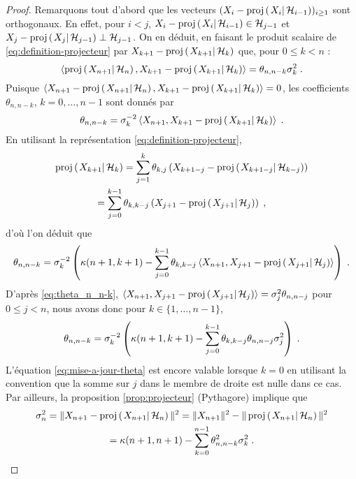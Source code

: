 \begin{proof}\smartqed
Remarquons tout d'abord que les vecteurs $(X_i -
\proj{X_i}{\cH_{i-1}})_{i \geq 1}$ sont orthogonaux. En effet,
pour $i < j$, $X_i - \proj{X_i}{\cH_{i-1}} \in \cH_{j-1}$ et $X_j -
\proj{X_j}{\cH_{j-1}} \perp \cH_{j-1}$.
On en d\'eduit, en faisant le produit scalaire de
\eqref{eq:definition-projecteur} par $X_{k+1}-\proj{X_{k+1}}{\cH_k}$
que, pour $0 \leq k < n$ :
\[
\pscal{\proj{X_{n+1}}{\cH_n}}{X_{k+1}-\proj{X_{k+1}}{\cH_k}}= \theta_{n,n-k} \sigma_{k}^2 \eqsp.
\]
Puisque $\pscal{X_{n+1}-\proj{X_{n+1}}{\cH_n}}{X_{k+1}-\proj{X_{k+1}}{\cH_k}}=0$, les coefficients $\theta_{n,n-k}$,
$k=0,\dots,n-1$ sont donn\'es par
\begin{equation}\label{eq:theta_n_n-k}
\theta_{n,n-k}= \sigma_{k}^{-2} \pscal{X_{n+1}}{X_{k+1}-\proj{X_{k+1}}{\cH_k}} \eqsp.
\end{equation}
En utilisant la repr\'esentation \eqref{eq:definition-projecteur},
\begin{multline*}
\proj{X_{k+1}}{\cH_k}=\sum_{j=1}^k \theta_{k,j} \left( X_{k+1-j} -
  \proj{X_{k+1-j}}{\cH_{k-j}}\right) \\
=\sum_{j=0}^{k-1} \theta_{k,k-j} \left( X_{j+1} -
  \proj{X_{j+1}}{\cH_{j}}\right) \eqsp,
\end{multline*}
d'o\`u l'on d\'eduit que
\[
\theta_{n,n-k}= \sigma_{k}^{-2} \left( \kappa(n+1,k+1) - \sum_{j=0}^{k-1} \theta_{k,k-j} \pscal{X_{n+1}}{X_{j+1}-\proj{X_{j+1}}{\cH_j}}\right) \eqsp.
\]
D'apr\`es \eqref{eq:theta_n_n-k},
 $\pscal{X_{n+1}}{X_{j+1}-\proj{X_{j+1}}{\cH_j}}= \sigma_{j}^{2} \theta_{n,n-j}$ pour $0 \leq j < n$, nous avons donc pour
$k \in \{1,\dots,n-1\}$,
\begin{equation}
\label{eq:mise-a-jour-theta}
\theta_{n,n-k}= \sigma_{k}^{-2} \left( \kappa(n+1,k+1) - \sum_{j=0}^{k-1} \theta_{k,k-j} \theta_{n,n-j} \sigma_{j}^2 \right) \;.
\end{equation}
L'\'equation \eqref{eq:mise-a-jour-theta} est encore valable lorsque
$k=0$ en utilisant la convention que la somme sur $j$ dans le membre
de droite est nulle dans ce cas.
Par ailleurs, la proposition \ref{prop:projecteur} (Pythagore) implique que
\begin{multline}
\label{eq:mise-a-jour-sigma}
\sigma_{n}^2= \| X_{n+1} - \proj{X_{n+1}}{\cH_n} \|^2= \| X_{n+1} \|^2 - \| \proj{X_{n+1}}{\cH_n} \|^2 \\
= \kappa(n+1,n+1) - \sum_{k=0}^{n-1} \theta^2_{n,n-k} \sigma_{k}^2 \eqsp.
\end{multline}

\end{proof}

